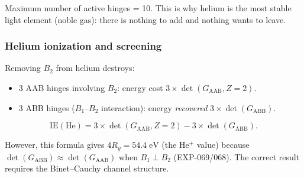 Maximum number of active hinges = 10. This is why helium is the most stable light element (noble gas): there is nothing to add and nothing wants to leave.

\subsubsection{Helium ionization and screening}

Removing $B_2$ from helium destroys:
\begin{itemize}
\item 3 AAB hinges involving $B_2$: energy cost $3 \times \det(G_{\text{AAB}}, Z\!=\!2)$.
\item 3 ABB hinges ($B_1$--$B_2$ interaction): energy \emph{recovered} $3 \times \det(G_{\text{ABB}})$.
\end{itemize}

\begin{equation}
\text{IE}(\text{He}) = 3 \times \det(G_{\text{AAB}}, Z\!=\!2) - 3 \times \det(G_{\text{ABB}}).
\end{equation}

However, this formula gives $4R_y = 54.4\;\text{eV}$ (the He$^+$ value) because $\det(G_\text{ABB}) \approx \det(G_\text{AAB})$ when $B_1 \perp B_2$ (EXP-069/068).  The correct result requires the Binet--Cauchy channel structure.

